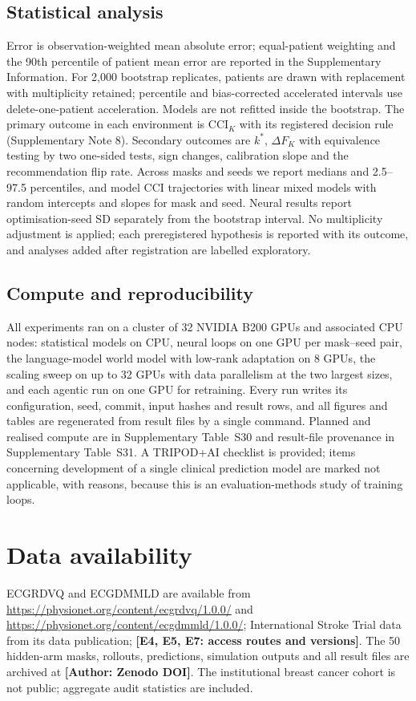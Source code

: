 \documentclass[11pt,a4paper]{article}
\newcommand{\tbd}[1]{{\color{red}\textbf{[#1]}}}
\newcommand{\authorpending}[1]{{\color{red}\textbf{[Author: #1]}}}
\newcommand{\CCI}{\mathrm{CCI}}
\begin{document}
\subsection{Statistical analysis}
Error is observation-weighted mean absolute error; equal-patient weighting and the 90th percentile of patient mean error are reported in the Supplementary Information. For 2,000 bootstrap replicates, patients are drawn with replacement with multiplicity retained; percentile and bias-corrected accelerated intervals use delete-one-patient acceleration\cite{efron1987}. Models are not refitted inside the bootstrap. The primary outcome in each environment is $\CCI_K$ with its registered decision rule (Supplementary Note 8). Secondary outcomes are $k^*$, $\Delta F_K$ with equivalence testing by two one-sided tests\cite{schuirmann1987tost}, sign changes, calibration slope and the recommendation flip rate. Across masks and seeds we report medians and 2.5--97.5 percentiles, and model CCI trajectories with linear mixed models with random intercepts and slopes for mask and seed. Neural results report optimisation-seed SD separately from the bootstrap interval. No multiplicity adjustment is applied; each preregistered hypothesis is reported with its outcome, and analyses added after registration are labelled exploratory.

\subsection{Compute and reproducibility}
All experiments ran on a cluster of 32 NVIDIA B200 GPUs and associated CPU nodes: statistical models on CPU, neural loops on one GPU per mask--seed pair, the language-model world model with low-rank adaptation on 8 GPUs, the scaling sweep on up to 32 GPUs with data parallelism at the two largest sizes, and each agentic run on one GPU for retraining. Every run writes its configuration, seed, commit, input hashes and result rows, and all figures and tables are regenerated from result files by a single command. Planned and realised compute are in Supplementary Table~S30 and result-file provenance in Supplementary Table~S31. A TRIPOD+AI checklist is provided; items concerning development of a single clinical prediction model are marked not applicable, with reasons, because this is an evaluation-methods study of training loops.

\section*{Data availability}
ECGRDVQ and ECGDMMLD are available from \url{https://physionet.org/content/ecgrdvq/1.0.0/} and \url{https://physionet.org/content/ecgdmmld/1.0.0/}; International Stroke Trial data from its data publication\cite{ist2011}; \tbd{E4, E5, E7: access routes and versions}. The 50 hidden-arm masks, rollouts, predictions, simulation outputs and all result files are archived at \authorpending{Zenodo DOI}. The institutional breast cancer cohort is not public; aggregate audit statistics are included.
\end{document}
